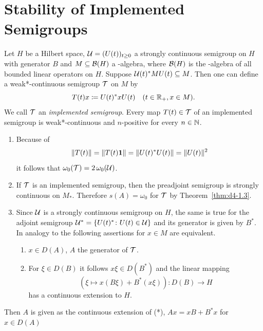 \section{Stability of Implemented Semigroups}
Let $H$ be a Hilbert space, $\UG = (U(t))_{t \geq 0}$ a strongly continuous semigroup on $H$ with generator $B$ and $M \subseteq \mathcal{B}(H)$ a \WA-algebra, where $\mathcal{B}(H)$ is the \WA-algebra of all bounded linear operators on $H$.
Suppose $\mathcal{U}(t)^{*}MU(t) \subseteq M$.
Then one can define a weak*-continuous semigroup $\mathcal{T}$ on $M$ by 
%
\[
	T(t)x \coloneqq U(t)^{*}xU(t) \quad (t \in \mathbb{R}_{+}, x \in M) .
\]
%
We call $\mathcal{T}$ an \emph{implemented semigroup}.
%
%
Every map $T(t) \in \mathcal{T}$ of an implemented semigroup is weak*-continuous and $n$-positive for every $n \in \mathbb{N}$.
\begin{remarks}\label{rem:d4-2.1}
\begin{enumerate}[\upshape (i), wide, labelindent=.25em]
\item\label{item:d4-2.1-i}
Because of
\[
	\|T(t)\| = \|T(t)\mathbf{1}\| = \|U(t)^{*}U(t)\| = \|U(t)\|^2
\]
it follows that $\omega_{0}(\mathcal{T}) = 2\,\omega_{0}(\mathcal{U})$.

\item\label{item:d4-2.1-ii}
If\/ $\mathcal{T}$ is an implemented semigroup, then the preadjoint semigroup is strongly continuous on $M_{*}$.
Therefore $s(A) = \omega_{0}$ for $\mathcal{T}$ by Theorem~\ref{thm:d4-1.3}.

\item\label{item:d4-2.1-iii}
Since $\mathcal{U}$ is a strongly continuous semigroup on $ H $, the same is true for the adjoint semigroup 
$\mathcal{U}^{*} = \{ U(t)^{*} \colon U(t) \in \mathcal{U} \}$ and its generator is given by $B^{*}$.
In analogy to \textcite[3.2.55]{brattelirobinson:1979} the following assertions for $x \in M$ are equivalent.
\begin{enumerate}[\upshape (a)]
\item
$x \in D(A)$, $ A $ the generator of\/ $ \mathcal{T} $.

\item
For $\xi \in D(B)$ it follows $x\xi \in D(B^{*})$ and the linear mapping
\begin{equation}
	(\xi \mapsto x(B\xi)+B^{*}(x\xi)): D(B) \to H \tag{*}
\end{equation}
has a continuous extension to $H$.
\end{enumerate}
\end{enumerate}
\end{remarks}
Then $A$ is given as the continuous extension of (*), \ie  $Ax = xB + B^{*}x$ for $ x \in D(A) $

